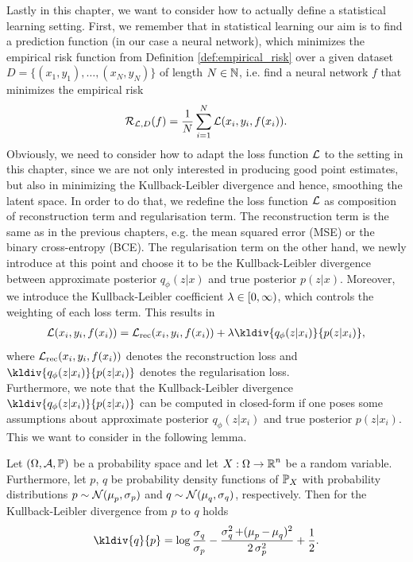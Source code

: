 Lastly in this chapter, we want to consider how to actually define a statistical learning setting. First, we remember that in statistical learning our aim is to find a prediction function (in our case a neural network), which minimizes the empirical risk function from Definition \ref{def:empirical_risk} over a given dataset $D= \{(x_1,y_1),\ldots, (x_N, y_N)\}$ of length $N\in\operatorname{\mathbb{N}}$, i.e. find a neural network $f$ that minimizes the empirical risk
\begin{align*}
\operatorname{\mathcal{R}}_{\operatorname{\mathcal{L}}, D} (f) = \frac{1}{N} \sum_{i=1}^N \operatorname{\mathcal{L}}(x_i, y_i, f(x_i)).
\end{align*}
Obviously, we need to consider how to adapt the loss function $\operatorname{\mathcal{L}}$ to the setting in this chapter, since we are not only interested in producing good point estimates, but also in minimizing the Kullback-Leibler divergence and hence, smoothing the latent space. In order to do that, we redefine the loss function $\operatorname{\mathcal{L}}$ as composition of reconstruction term and regularisation term. The reconstruction term is the same as in the previous chapters, e.g. the mean squared error (MSE) or the binary cross-entropy (BCE). The regularisation term on the other hand, we newly introduce at this point and choose it to be the Kullback-Leibler divergence between approximate posterior $q_{\phi}(z|x)$ and true posterior $p(z|x)$. Moreover, we introduce the Kullback-Leibler coefficient $\lambda\in [0,\infty)$, which controls the weighting of each loss term. This results in
\begin{align*}
\loss(x_i, y_i, f(x_i)) = \loss_{\text{rec}}(x_i, y_i, f(x_i)) + \l \kldiv{q_{\phi}(z|x_i)}{p(z|x_i)},
\end{align*}
where $\operatorname{\mathcal{L}}_{\text{rec}}(x_i, y_i, f(x_i))$ denotes the reconstruction loss and $\kldiv{q_{\phi}(z|x_i)}{p(z|x_i)}$ denotes the regularisation loss.\\
Furthermore, we note that the Kullback-Leibler divergence $\kldiv{q_{\phi}(z|x_i)}{p(z|x_i)}$ can be computed in closed-form if one poses some assumptions about approximate posterior $q_{\phi}(z|x_i)$ and true posterior $p(z|x_i)$. This we want to consider in the following lemma.

\begin{lemma}\label{lemma:kl_div}
Let $(\Omega,\operatorname{\mathcal{A}}, \operatorname{\mathbb{P}})$ be a probability space and let $X:\Omega\to\operatorname{\mathbb{R}}^{n}$ be a random variable. Furthermore, let $p$, $q$ be probability density functions of $\operatorname{\mathbb{P}}_X$ with probability distributions $p\sim \mathcal{N}(\operatorname{\mu}_p, \operatorname{\sigma}_p)$ and $q\sim \mathcal{N}(\operatorname{\mu}_q, \operatorname{\sigma}_q)$, respectively. Then for the Kullback-Leibler divergence from $p$ to $q$ holds
\begin{align*}
\kldiv{q}{p} = \log \frac{\s_q}{\s_p} - \frac{\s_q^2 + (\m_p - \m_q)^2}{2\s_p^2} + \frac{1}{2}.
\end{align*}
\end{lemma}

